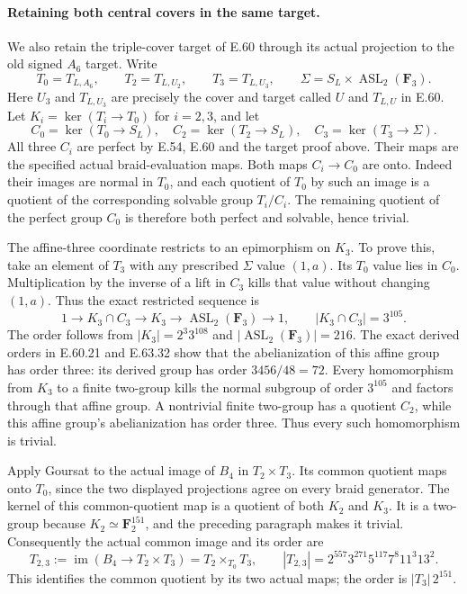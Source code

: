 \paragraph{Retaining both central covers in the same target.}
We also retain the triple-cover target of E.60 through its actual
projection to the old signed $A_6$ target. Write
\[
 T_0=T_{L,A_6},\qquad T_2=T_{L,U_2},\qquad
 T_3=T_{L,U_3},\qquad
 \Sigma=S_L\times\operatorname{ASL}_2(\mathbf F_3).
\]
Here $U_3$ and $T_{L,U_3}$ are precisely the cover and target called
$U$ and $T_{L,U}$ in E.60. Let $K_i=\ker(T_i\to T_0)$ for
$i=2,3$, and let
\[
 C_0=\ker(T_0\to S_L),\quad
 C_2=\ker(T_2\to S_L),\quad
 C_3=\ker(T_3\to\Sigma).
\]
All three $C_i$ are perfect by E.54, E.60 and the target proof
above. Their maps are the specified actual braid-evaluation maps.
Both maps $C_i\to C_0$ are onto. Indeed their images are normal
in $T_0$, and each quotient of $T_0$ by such an image is a
quotient of the corresponding solvable group $T_i/C_i$.
The remaining quotient of the perfect group $C_0$ is therefore
both perfect and solvable, hence trivial.

The affine-three coordinate restricts to an epimorphism on $K_3$.
To prove this, take an element of $T_3$ with any prescribed
$\Sigma$ value $(1,a)$. Its $T_0$ value lies in $C_0$.
Multiplication by the inverse of a lift in $C_3$ kills that value
without changing $(1,a)$. Thus the exact restricted sequence is
\begin{equation}
 1\longrightarrow K_3\cap C_3\longrightarrow K_3
 \longrightarrow\operatorname{ASL}_2(\mathbf F_3)
 \longrightarrow1,\qquad |K_3\cap C_3|=3^{105}.
 \tag{E.63.36}\label{eq:E63-both-cover-kernel}
\end{equation}
The order follows from $|K_3|=2^3 3^{108}$ and
$|\operatorname{ASL}_2(\mathbf F_3)|=216$.
The exact derived orders in E.60.21 and E.63.32 show that the
abelianization of this affine group has order three:
its derived group has order $3456/48=72$.
Every homomorphism from $K_3$ to a finite two-group kills the
normal subgroup of order $3^{105}$ and factors through that
affine group. A nontrivial finite two-group has a quotient $C_2$,
while this affine group's abelianization has order three.
Thus every such homomorphism is trivial.

Apply Goursat to the actual image of $B_4$ in $T_2\times T_3$.
Its common quotient maps onto $T_0$, since the two displayed
projections agree on every braid generator. The kernel of this
common-quotient map is a quotient of both $K_2$ and $K_3$.
It is a two-group because $K_2\simeq\mathbf F_2^{151}$,
and the preceding paragraph makes it trivial. Consequently
the actual common image and its order are
\begin{equation}
 T_{2,3}:=\operatorname{im}(B_4\to T_2\times T_3)
       =T_2\times_{T_0}T_3,\qquad
 |T_{2,3}|=2^{557}3^{271}5^{117}7^8 11^3 13^2.
 \tag{E.63.37}\label{eq:E63-both-cover-target}
\end{equation}
This identifies the common quotient by its two actual maps;
the order is $|T_3|\,2^{151}$.

